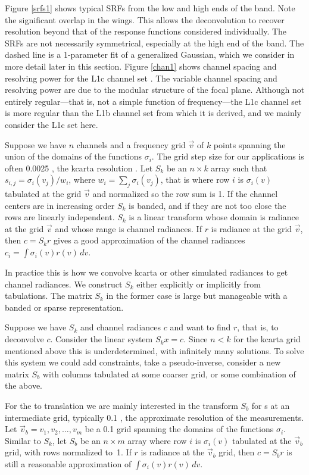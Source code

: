 \documentclass[11pt]{article}
\begin{document}
Figure \ref{srfs1} shows typical {\airs} SRFs from the low and high
ends of the band.  Note the significant overlap in the wings.  This
allows the deconvolution to recover resolution beyond that of the
response functions considered individually.  The SRFs are not
necessarily symmetrical, especially at the high end of the band.
The dashed line is a 1-parameter fit of a generalized Gaussian,
which we consider in more detail later in this section.  Figure
\ref{chan1} shows channel spacing and resolving power for the
{\airs} L1c channel set \cite{airs1c}.  The variable channel spacing
and resolving power are due to the modular structure of the focal
plane.  Although not entirely regular---that is, not a simple
function of frequency---the L1c channel set is more regular than the
L1b channel set from which it is derived, and we mainly consider the
L1c set here.

Suppose we have $n$ channels and a frequency grid $\vec v$ of $k$
points spanning the union of the domains of the functions
$\sigma_i$.  The grid step size for our applications is often 0.0025
{\wn}, the kcarta resolution \cite{kcarta1}.  Let $S_k$ be an
$n\times k$ array such that $s_{i,j} = \sigma_i(v_j)/w_i$, where
$w_i = \sum_j \sigma_i(v_j)$, that is where row $i$ is $\sigma_i(v)$
tabulated at the grid $\vec v$ and normalized so the row sum is 1.
If the channel centers are in increasing order $S_k$ is banded, and
if they are not too close the rows are linearly independent.  $S_k$
is a linear transform whose domain is radiance at the grid $\vec v$
and whose range is channel radiances.  If $r$ is radiance at the
grid $\vec v$, then $c = S_k r$ gives a good approximation of the
channel radiances $c_i = \int\sigma_i(v)r(v)\,dv$.

In practice this is how we convolve kcarta or other simulated
radiances to get {\airs} channel radiances.  We construct $S_k$
either explicitly or implicitly from {\airs} {\srf} tabulations.
The matrix $S_k$ in the former case is large but manageable with a
banded or sparse representation.

Suppose we have $S_k$ and channel radiances $c$ and want to find
$r$, that is, to deconvolve $c$.  Consider the linear system $S_k x
= c$.  Since $n < k$ for the kcarta grid mentioned above this is
underdetermined, with infinitely many solutions.  To solve this
system we could add constraints, take a pseudo-inverse, consider a
new matrix $S_b$ with columns tabulated at some coarser grid, or
some combination of the above.

For the {\airs} to {\cris} translation we are mainly interested in 
the transform $S_b$ for {\srf}s at an intermediate grid, typically
0.1 {\wn}, the approximate resolution of the {\srf} measurements.
Let $\vec v_b = v_1,v_2,\ldots,v_m$ be a 0.1 {\wn} grid spanning the
domains of the functions $\sigma_i$.  Similar to $S_k$, let $S_b$ be
an $n\times m$ array where row $i$ is $\sigma_i(v)$ tabulated at the
$\vec v_b$ grid, with rows normalized to~1.  If $r$ is radiance at
the $\vec v_b$ grid, then $c = S_b r$ is still a reasonable
approximation of $\int\sigma_i(v)r(v)\,dv$.
\end{document}
